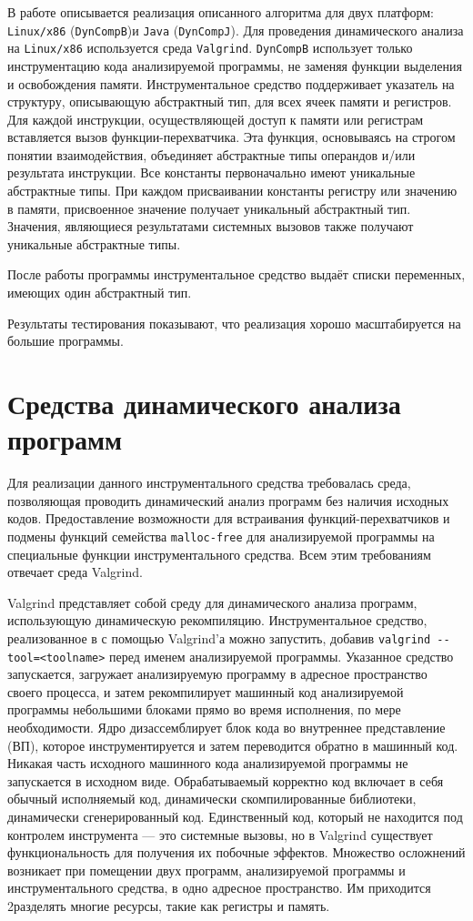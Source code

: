 \documentclass[a4paper,12pt,russian]{article}
\begin{document}
В работе описывается реализация описанного алгоритма для двух платформ: \texttt{Linux/x86} (\texttt{DynCompB})и \texttt{Java} (\texttt{DynCompJ}).
Для проведения динамического анализа на \texttt{Linux/x86} используется среда \texttt{Valgrind}.
\texttt{DynCompB} использует только инструментацию кода анализируемой программы, не заменяя функции выделения и освобождения памяти.
Инструментальное средство поддерживает указатель на структуру, описывающую абстрактный тип, для всех ячеек памяти и регистров.
Для каждой инструкции, осуществляющей доступ к памяти или регистрам вставляется вызов функции-перехватчика.
Эта функция, основываясь на строгом понятии взаимодействия, объединяет абстрактные типы операндов и/или результата инструкции.
Все константы первоначально имеют уникальные абстрактные типы.
При каждом присваивании константы регистру или значению в памяти, присвоенное значение получает уникальный абстрактный тип.
Значения, являющиеся результатами системных вызовов также получают уникальные абстрактные типы.

После работы программы инструментальное средство выдаёт списки переменных, имеющих один абстрактный тип.

Результаты тестирования показывают, что реализация хорошо масштабируется на большие программы.

\newpage
\section{Средства динамического анализа программ}
\label{valgrind_section}
Для реализации данного инструментального средства требовалась среда, позволяющая проводить динамический анализ программ без наличия исходных кодов.
Предоставление возможности для встраивания функций-перехватчиков и подмены функций семейства \texttt{malloc-free} для анализируемой программы на специальные функции инструментального средства.
Всем этим требованиям отвечает среда Valgrind.

Valgrind представляет собой среду для динамического анализа программ, использующую динамическую рекомпиляцию.
Инструментальное средство, реализованное в с помощью Valgrind'а можно запустить, добавив \texttt{valgrind -{}-tool=<toolname>} перед именем анализируемой программы. Указанное средство запускается, загружает анализируемую программу в адресное пространство своего процесса, и затем рекомпилирует машинный код анализируемой программы небольшими блоками прямо во время исполнения, по мере необходимости.
Ядро дизассемблирует блок кода во внутреннее представление (ВП), которое инструментируется и затем переводится обратно в машинный код.
Никакая часть исходного машинного кода анализируемой программы не запускается в исходном виде. Обрабатываемый корректно код включает в себя обычный исполняемый код, динамически скомпилированные библиотеки, динамически сгенерированный код. Единственный код, который не находится под контролем инструмента --- это системные вызовы, но в Valgrind существует функциональность для получения их побочные эффектов. Множество осложнений возникает при помещении двух программ, анализируемой программы и инструментального средства, в одно адресное пространство. Им приходится 2разделять многие ресурсы, такие как регистры и память.
\end{document}

